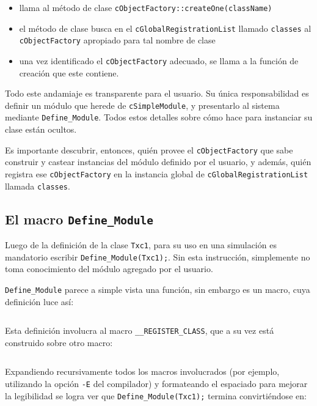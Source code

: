\begin{itemize}
    \item llama al método de clase \verb!cObjectFactory::createOne(className)!

    \item el método de clase busca en el \verb!cGlobalRegistrationList! llamado
\verb!classes! al \verb!cObjectFactory! apropiado para tal nombre de clase

    \item una vez identificado el \verb!cObjectFactory! adecuado, se llama a la
función de creación que este contiene.

\end{itemize}

Todo este andamiaje es transparente para el usuario. Su única responsabilidad
es definir un módulo que herede de \verb!cSimpleModule!, y presentarlo al
sistema mediante \verb!Define_Module!. Todos estos detalles sobre cómo hace
\omnetpp{} para instanciar su clase están ocultos.

Es importante descubrir, entonces, quién provee el \verb!cObjectFactory! que
sabe construir y castear instancias del módulo definido por el usuario, y
además, quién registra ese \verb!cObjectFactory! en la instancia global de
\verb!cGlobalRegistrationList! llamada \verb!classes!.

\subsection{El macro \texttt{Define\_Module}}

Luego de la definición de la clase \verb!Txc1!, para su uso en una simulación
es mandatorio escribir \verb!Define_Module(Txc1);!. Sin esta instrucción,
\omnetpp{} simplemente no toma conocimiento del módulo agregado por el usuario.

\verb!Define_Module! parece a simple vista una función, sin embargo es un
macro, cuya definición luce así:

\inputminted{c++}{codelistings/define_module_1.cc}

Esta definición involucra al macro \verb!__REGISTER_CLASS!, que a su vez está
construido sobre otro macro:

\inputminted{c++}{codelistings/define_module_2.cc}

Expandiendo recursivamente todos los macros involucrados (por ejemplo,
utilizando la opción \verb!-E! del compilador) y formateando el espaciado para
mejorar la legibilidad se logra ver que \verb!Define_Module(Txc1);! termina
convirtiéndose en:

